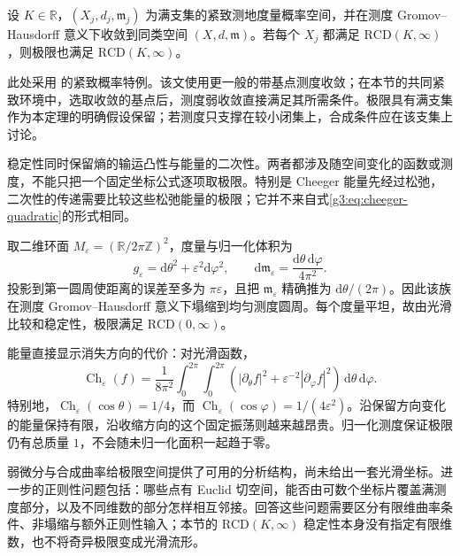 \begin{theorem}\label{g3:thm:compact-rcd-stability}
	设 \(K\in\mathbb R\)，\((X_j,d_j,\mathfrak m_j)\) 为满支集的紧致测地度量概率空间，并在测度 Gromov--Hausdorff 意义下收敛到同类空间 \((X,d,\mathfrak m)\)。若每个 \(X_j\) 都满足 \(\mathrm{RCD}(K,\infty)\)，则极限也满足 \(\mathrm{RCD}(K,\infty)\)。
\end{theorem}

此处采用 \cite[定理7.2，2013年11月19日作者稿第54页]{GigliMondinoSavare2015Stability}的紧致概率特例。该文使用更一般的带基点测度收敛；在本节的共同紧致环境中，选取收敛的基点后，测度弱收敛直接满足其所需条件。极限具有满支集作为本定理的明确假设保留；若测度只支撑在较小闭集上，合成条件应在该支集上讨论。

\ProseParagraphBreak
稳定性同时保留熵的输运凸性与能量的二次性。两者都涉及随空间变化的函数或测度，不能只把一个固定坐标公式逐项取极限。特别是 Cheeger 能量先经过松弛，二次性的传递需要比较这些松弛能量的极限；它并不来自式\eqref{g3:eq:cheeger-quadratic}的形式相同。

\begin{example}\label{g3:exm:collapsed-torus-cheeger-energy}
	取二维环面 \(M_\varepsilon=(\mathbb R/2\pi\mathbb Z)^2\)，度量与归一化体积为
	\[
		g_\varepsilon=\mathrm d\theta^2+\varepsilon^2\mathrm d\varphi^2,
		\qquad
		\mathrm d\mathfrak m_\varepsilon=\frac{\mathrm d\theta\,\mathrm d\varphi}{4\pi^2}.
	\]
	投影到第一圆周使距离的误差至多为 \(\pi\varepsilon\)，且把 \(\mathfrak m_\varepsilon\) 精确推为 \(\mathrm d\theta/(2\pi)\)。因此该族在测度 Gromov--Hausdorff 意义下塌缩到均匀测度圆周。每个度量平坦，故由光滑比较和稳定性，极限满足 \(\mathrm{RCD}(0,\infty)\)。

	能量直接显示消失方向的代价：对光滑函数，
	\[
		\operatorname{Ch}_\varepsilon(f)
		=\frac1{8\pi^2}\int_0^{2\pi}\int_0^{2\pi}
		\left(|\partial_\theta f|^2+\varepsilon^{-2}|\partial_\varphi f|^2\right)
		\,\mathrm d\theta\,\mathrm d\varphi.
	\]
	特别地，\(\operatorname{Ch}_\varepsilon(\cos\theta)=1/4\)，而 \(\operatorname{Ch}_\varepsilon(\cos\varphi)=1/(4\varepsilon^2)\)。沿保留方向变化的能量保持有限，沿收缩方向的这个固定振荡则越来越昂贵。归一化测度保证极限仍有总质量 \(1\)，不会随未归一化面积一起趋于零。
\end{example}

弱微分与合成曲率给极限空间提供了可用的分析结构，尚未给出一套光滑坐标。进一步的正则性问题包括：哪些点有 Euclid 切空间，能否由可数个坐标片覆盖满测度部分，以及不同维数的部分怎样相互邻接。回答这些问题需要区分有限维曲率条件、非塌缩与额外正则性输入；本节的 \(\mathrm{RCD}(K,\infty)\) 稳定性本身没有指定有限维数，也不将奇异极限变成光滑流形。
